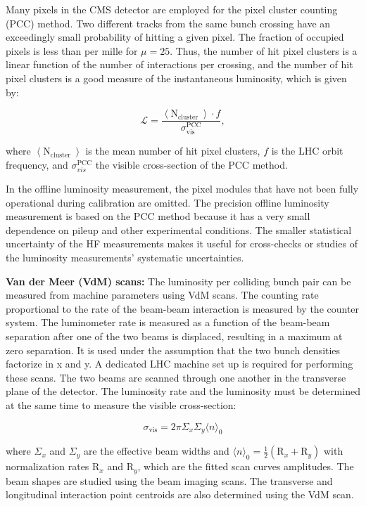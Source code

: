 Many pixels in the CMS detector are employed for the pixel cluster counting (PCC) method. Two different tracks from the same bunch crossing have an exceedingly small probability of hitting a given pixel. The fraction of occupied pixels is less than per mille for $\mu = 25$. Thus, the number of hit pixel clusters is a linear function of the number of interactions per crossing, and the number of hit pixel clusters is a good measure of the instantaneous luminosity, which is given by:

\begin{equation}
  \mathcal{L}=\frac{\left\langle\text{N}_{\text {cluster }}\right\rangle \cdot f}{\sigma_{\text{vis}}^{\text{PCC}}},
\end{equation}

where $\left\langle\text{N}_{\text {cluster }}\right\rangle$ is the mean number of hit pixel clusters, $f$ is the LHC orbit frequency, and $\sigma_{vis}^{\text{PCC}}$ the visible cross-section of the PCC method.

In the offline luminosity measurement, the pixel modules that have not been fully operational during calibration are omitted. The precision offline luminosity measurement is based on the PCC method because it has a very small dependence on pileup and other experimental conditions. The smaller statistical uncertainty of the HF measurements makes it useful for cross-checks or studies of the luminosity measurements' systematic uncertainties.

\textbf{Van der Meer (VdM) scans:} The luminosity per colliding bunch pair can be measured from machine parameters using VdM scans. The counting rate proportional to the rate of the beam-beam interaction is measured by the counter system. The luminometer rate is measured as a function of the beam-beam separation after one of the two beams is displaced, resulting in a maximum at zero separation. It is used under the assumption that the two bunch densities factorize in x and y. A dedicated LHC machine set up is required for performing these scans. The two beams are scanned through one another in the transverse plane of the detector. The luminosity rate and the luminosity must be determined at the same time to measure the visible cross-section:

\begin{equation}
  \sigma_{\text{vis}}=2 \pi \Sigma_{x} \Sigma_{y}\langle n\rangle_{0}
\end{equation}

where $\Sigma_{x}$ and $\Sigma_{y}$ are the effective beam widths and $\langle n\rangle_{0}=\frac{1}{2}\left(\text{R}_{x}+\text{R}_{y}\right)$ with normalization rates $\text{R}_x$ and $\text{R}_y$, which are the fitted scan curves amplitudes. The beam shapes are studied using the beam imaging scans. The transverse and longitudinal interaction point centroids are also determined using the VdM scan.

